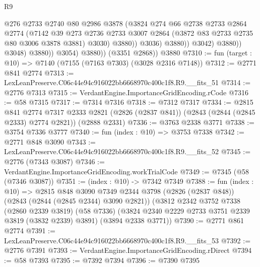 \begin{lexlean}{R9}
\begin{coremodule}
                                @276
                                @2733
                                @2740
                                @80
                                @2986
                                @3878
                                (@3824
                                  @274
                                  @66
                                  @2738
                                  @2733
                                  @2864
                                  @2774
                                  (@7142
                                    @39
                                    @273
                                    @2736
                                    @2733
                                    @3007
                                    @2864
                                    (@3872 @83 @2733 @2735 @80 @3006 @3878 @3881)
                                    @3030)
                                  @3880))
                              @3036)
                            @3880))
                        @3042)
                      @3880))
                  @3048)
                @3880))
            @3054)
          @3880))
      (@3351 @2868))
    @3880
@7310 := fun (target : @10) => @7140 (@7155 (@7163 @7303) (@3028 @2316 @7148))
@7312 := @2771 @841 @2774
@7313 := LexLeanPreserve.C06c44e94c916022bb6668970c400c1f8.R9.__fits_51
@7314 := @2776 @7313
@7315 := VerdantEngine.ImportanceGridEncoding.rCode
@7316 := @58 @7315
@7317 := @7314 @7316
@7318 := @7312 @7317
@7334 := @2815
    @841
    @2774
    @7317
    @2333
    @2821
    (@2826 (@2837 @841))
    (@2843 (@2844 (@2845 @2333) @2774 @2821))
    (@2888 @2331)
@7336 := @3763 @2338 @3771
@7338 := @3754 @7336 @3777
@7340 := fun (index : @10) => @3753 @7338
@7342 := @2771 @848 @3090
@7343 := LexLeanPreserve.C06c44e94c916022bb6668970c400c1f8.R9.__fits_52
@7345 := @2776 (@7343 @3087)
@7346 := VerdantEngine.ImportanceGridEncoding.workTrialCode
@7349 := @7345 (@58 (@7346 @3087))
@7351 := (index : @10) -> @7342 @7349
@7388 := fun (index : @10) =>
  @2815
    @848
    @3090
    @7349
    @2344
    @3798
    (@2826 (@2837 @848))
    (@2843 (@2844 (@2845 @2344) @3090 @2821))
    (@3812
      @2342
      @3752
      @7338
      (@2860 @2339 @3819)
      (@58 @7336)
      (@3824 @2340 @2229 @2733 @3751 @2339 @3819 (@3832 @2339) @3891)
      (@3894 @2338 @3771))
@7390 := @2771 @861 @2774
@7391 := LexLeanPreserve.C06c44e94c916022bb6668970c400c1f8.R9.__fits_53
@7392 := @2776 @7391
@7393 := VerdantEngine.ImportanceGridEncoding.rDirect
@7394 := @58 @7393
@7395 := @7392 @7394
@7396 := @7390 @7395

\end{coremodule}
\end{lexlean}
